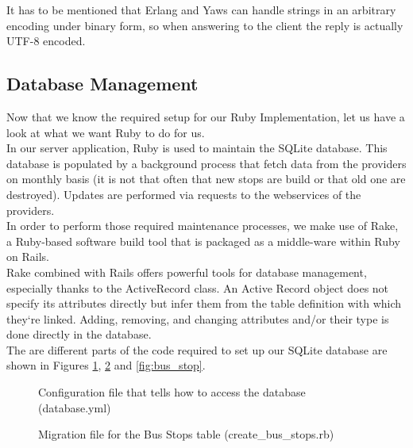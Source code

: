 It has to be mentioned that Erlang and Yaws can handle strings in an arbitrary encoding under binary form, so when answering to the client the reply is actually UTF-8 encoded.

\subsection{Database Management}

Now that we know the required setup for our Ruby Implementation, let us have a look at what we want Ruby to do for us.\\

In our server application, Ruby is used to maintain the SQLite database.  This database is populated by a background process that fetch data from the providers on monthly basis (it is not that often that new stops are build or that old one are destroyed). Updates are performed via requests to the webservices of the providers.\\

In order to perform those required maintenance processes, we make use of Rake, a Ruby-based software build tool that is packaged as a middle-ware within Ruby on Rails.\\

Rake combined with Rails offers powerful tools for database management, especially thanks to the ActiveRecord class. An Active Record object does not specify its attributes directly but infer them from the table definition with which they‘re linked. Adding, removing, and changing attributes and/or their type is done directly in the database.\\

The are different parts of the code required to set up our SQLite database are shown in Figures \ref{fig:database}, \ref{fig:create_bus_stops} and \ref{fig:bus_stop}. 

\begin{figure}[ht]
  \centering
  \caption{Configuration file that tells how to access the database (database.yml)}
  \label{fig:database}
\end{figure}

\clearpage

\begin{figure}[ht]
  \centering
  \caption{Migration file for the Bus Stops table (create\_bus\_stops.rb)}
  \label{fig:create_bus_stops}
\end{figure}

